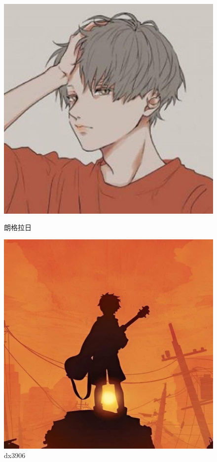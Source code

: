 \documentclass[a4paper]{article}  %
\begin{document}
\begin{figure}[htbp]
	\begin{minipage}{0.49\linewidth}
		\centering
		\includegraphics[width=0.9\linewidth]{contents/rsa4.jpg}
		\caption{朗格拉日}
		\label{Lagrange}%
	\end{minipage}
	\begin{minipage}{0.49\linewidth}
		\centering
		\includegraphics[width=0.9\linewidth]{contents/rsa5.jpg}
		\caption{dx3906}
		\label{dx906999}%
	\end{minipage}
\end{figure}
\end{document}
